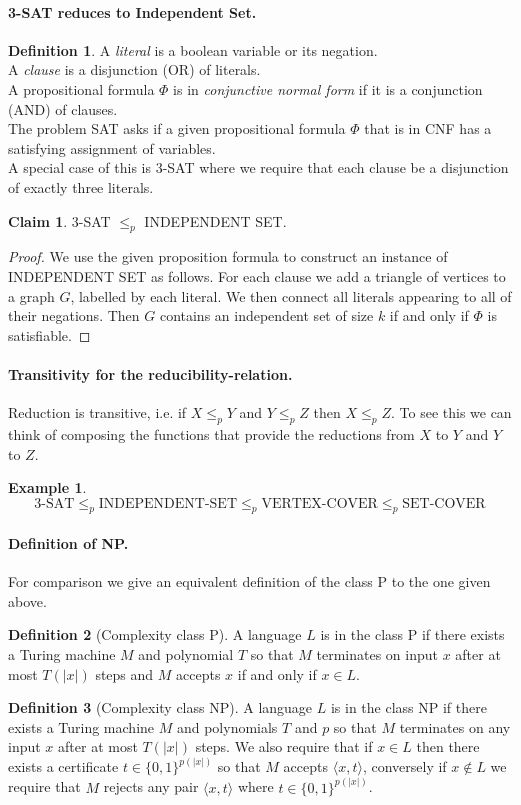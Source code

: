\documentclass[11pt,a4paper]{article}
\theoremstyle{definition}
\newtheorem{claim}{Claim}
\newtheorem{defn}{Definition}
\newtheorem{ex}{Example}
\begin{document}
\paragraph{3-SAT reduces to Independent Set.}
\begin{defn}
A \emph{literal} is a boolean variable or its negation.\\
A \emph{clause} is a disjunction (OR) of literals.\\
A propositional formula $\Phi$ is in \emph{conjunctive normal form} if it is a conjunction (AND) of clauses.\\
The problem SAT asks if a given propositional formula $\Phi$ that is in CNF has a satisfying assignment of variables.\\
A special case of this is 3-SAT where we require that each clause be a disjunction of exactly three literals.
\end{defn}
\begin{claim}
3-SAT $\le_p$ INDEPENDENT SET.
\end{claim}
\begin{proof}
We use the given proposition formula to construct an instance of INDEPENDENT SET as follows.
For each clause we add a triangle of vertices to a graph $G$, labelled by each literal.
We then connect all literals appearing to all of their negations.
Then $G$ contains an independent set of size $k$ if and only if $\Phi$ is satisfiable.
\end{proof}

\paragraph{Transitivity for the reducibility-relation.}
Reduction is transitive, i.e. if $X \le_p Y$ and $Y \le_p Z$ then $X\le_p Z$.
To see this we can think of composing the functions that provide the reductions from $X$ to $Y$ and $Y$ to $Z$.
\begin{ex}
\[
3\text{-SAT}\le_p \text{INDEPENDENT-SET} \le_p \text{VERTEX-COVER} \le_p \text{SET-COVER}
\]
\end{ex}

\paragraph{Definition of NP.}
For comparison we give an equivalent definition of the class P to the one given above.
\begin{defn}[Complexity class P]
A language $L$ is in the class P if there exists a Turing machine $M$ and polynomial $T$ so that $M$ terminates on input $x$ after at most $T(|x|)$ steps and $M$ accepts $x$ if and only if $x\in L$.
\end{defn}
\begin{defn}[Complexity class NP]
A language $L$ is in the class NP if there exists a Turing machine $M$ and polynomials $T$ and $p$ so that $M$ terminates on any input $x$ after at most $T(|x|)$ steps.
We also require that if $x\in L$ then there exists a certificate $t\in\{0,1\}^{p(|x|)}$ so that $M$ accepts $\langle x, t\rangle$, conversely if $x\not\in L$ we require that $M$ rejects any pair $\langle x,t\rangle$ where $t\in\{0,1\}^{p(|x|)}$.
\end{defn}
\end{document}
